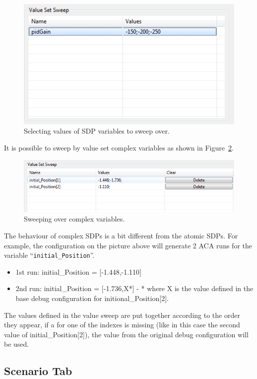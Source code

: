 \documentclass{crescendorepchap}
\begin{document}
\begin{figure}[htbp]
\centering
\includegraphics[width=.6\textwidth]{images/ValueSetSweep.png}
\caption{Selecting values of SDP variables to sweep over.\label{fig:ValueSetSweep}}
\end{figure}

It is possible to sweep by value set complex variables as shown in Figure~\ref{fig:ValueSetSweepComplex}.

\begin{figure}[htbp]
\centering
\includegraphics[width=.6\textwidth]{images/ValueSetSweepComplex.png}
\caption{Sweeping over complex variables.\label{fig:ValueSetSweepComplex}}
\end{figure}

The behaviour of complex SDPs is a bit different from the atomic SDPs.
For example, the configuration on the picture above will generate 2 ACA
runs for the variable ``\texttt{initial\_Position}''.

\begin{itemize}
\item 1st run: initial\_Position = {[}-1.448,-1.110{]}

\item 2nd run: initial\_Position = {[}-1.736,X*{]} - * where X is the value
defined in the base debug configuration for initional\_Position{[}2{]}.
\end{itemize}

The values defined in the value sweep are put together according to the
order they appear, if a for one of the indexes is missing (like in this
case the second value of initial\_Position{[}2{]}), the value from the
original debug configuration will be used.

\subsection{Scenario Tab}
\end{document}
